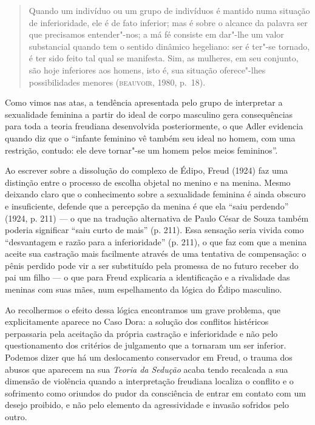 \begin{quote}
Quando um indivíduo ou um grupo de indivíduos é mantido numa situação de
inferioridade, ele é de fato inferior; mas é sobre o alcance da palavra
ser que precisamos entender"-nos; a má fé consiste em dar"-lhe um valor
substancial quando tem o sentido dinâmico hegeliano: ser é ter"-se
tornado, é ter sido feito tal qual se manifesta. Sim, as mulheres, em
seu conjunto, são hoje inferiores aos homens, isto é, sua situação
oferece"-lhes possibilidades menores (\textsc{beauvoir}, 1980, p.~18).
\end{quote}

Como vimos nas atas, a tendência apresentada pelo grupo de interpretar a
sexualidade feminina a partir do ideal de corpo masculino gera
consequências para toda a teoria freudiana desenvolvida posteriormente,
o que Adler evidencia quando diz que o ``infante feminino vê também seu
ideal no homem, com uma restrição, contudo: ele deve tornar"-se um homem
pelos meios femininos''.

Ao escrever sobre a dissolução do complexo de Édipo, Freud (1924) faz
uma distinção entre o processo de escolha objetal no menino e na menina.
Mesmo deixando claro que o conhecimento sobre a sexualidade feminina é
ainda obscuro e insuficiente, defende que a percepção da menina é que
ela ``saiu perdendo'' (1924, p. 211) --- o que na tradução
alternativa de Paulo César de Souza também poderia significar ``saiu
curto de mais'' (p. 211). Essa sensação seria vivida como
``desvantagem e razão para a inferioridade'' (p. 211), o que
faz com que a menina aceite sua castração mais facilmente através de uma
tentativa de compensação: o pênis perdido pode vir a ser substituído
pela promessa de no futuro receber do pai um filho --- o que para Freud
explicaria a identificação e a rivalidade das meninas com suas mães, num
espelhamento da lógica do Édipo masculino.

Ao recolhermos o efeito dessa lógica encontramos um grave problema,
que explicitamente aparece no Caso Dora: a solução dos conflitos
histéricos perpassaria pela aceitação da própria castração e
inferioridade e não pelo questionamento dos critérios de julgamento que
a tornaram um ser inferior. Podemos dizer que há um deslocamento
conservador em Freud, o trauma dos abusos que aparecem na sua \emph{Teoria da
Sedução} acaba tendo recalcada a sua dimensão de violência quando a
interpretação freudiana localiza o conflito e o sofrimento como oriundos
do pudor da consciência de entrar em contato com um desejo proibido, e
não pelo elemento da agressividade e invasão sofridos pelo outro.

